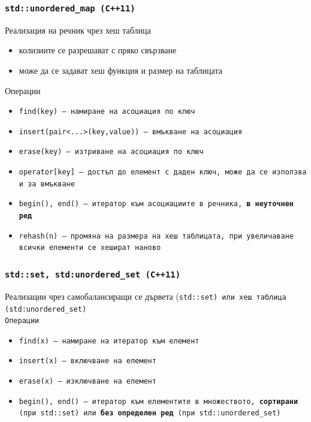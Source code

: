 \documentclass[alsotrans,beameroptions={aspectratio=169}]{beamerswitch}
\begin{document}
\begin{frame}
  \frametitle{\tt{std::unordered\_map} (C++11)}
  Реализация на речник чрез хеш таблица
  \begin{itemize}
  \item колизиите се разрешават с пряко свързване
  \item може да се задават хеш функция и размер на таблицата
  \end{itemize}
  Операции
  \begin{itemize}
  \item \tt{find(key)} --- намиране на асоциация по ключ
  \item \tt{insert(pair<...>(key,value))} --- вмъкване на асоциация
  \item \tt{erase(key)} --- изтриване на асоциация по ключ
  \item \tt{operator[key]} --- достъп до елемент с даден ключ, може да се използва и за вмъкване
  \item \tt{begin(), end()} --- итератор към асоциациите в речника, \textbf{в неуточнен ред}
  \item \tt{rehash(n)} --- промяна на размера на хеш таблицата, при увеличаване всички елементи се хешират наново
  \end{itemize}
\end{frame}


\begin{frame}
  \frametitle{\tt{std::set}, \tt{std:unordered\_set} (C++11)}
  Реализации чрез самобалансиращи се дървета (\tt{std::set}) или хеш таблица (\tt{std:unordered\_set})\\[1ex]
  Операции
  \begin{itemize}
  \item \tt{find(x)} --- намиране на итератор към елемент
  \item \tt{insert(x)} --- включване на елемент
  \item \tt{erase(x)} --- изключване на елемент
  \item \tt{begin(), end()} --- итератор към елементите в множеството, \textbf{сортирани} (при \tt{std::set}) или \textbf{без определен ред} (при \tt{std::unordered\_set})
  \end{itemize}
\end{frame}
\end{document}
